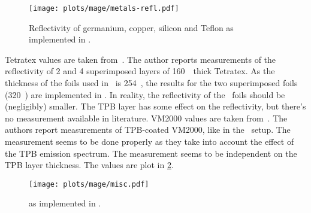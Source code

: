 \begin{figure}
  \centering
  \texttt{[image: plots/mage/metals-refl.pdf]}
  \caption{%
    Reflectivity of germanium, copper, silicon and Teflon as implemented in \mage.
  }\label{fig:bkg:lar:ph2:mage:metals-refl}
\end{figure}

Tetratex\reg{} values are taken from~\cite{Janecek2012}. The author reports measurements
of the reflectivity of 2 and 4 superimposed layers of 160~\mum\ thick Tetratex. As the
thickness of the foils used in \gerda\ is 254~\mum, the results for the two superimposed
foils (320~\mum) are implemented in \mage. In reality, the reflectivity of the \gerda\
foils should be (negligibly) smaller. The TPB layer has some effect on the reflectivity,
but there's no measurement available in literature.  VM2000 values are taken
from~\cite{Francini2013}.  The authors report measurements of TPB-coated VM2000, like in
the \gerda\ setup. The measurement seems to be done properly as they take into account the
effect of the TPB emission spectrum.  The measurement seems to be independent on the TPB
layer thickness. The values are plot in \cref{fig:bkg:lar:ph2:mage:misc}.

\begin{figure}
  \centering
  \texttt{[image: plots/mage/misc.pdf]}
  \caption{%
    as implemented in \mage.
  }\label{fig:bkg:lar:ph2:mage:misc}
\end{figure}

